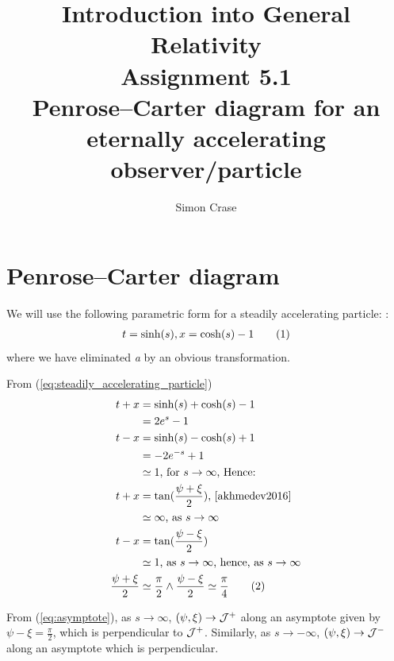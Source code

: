 \documentclass[]{article}
\title{Introduction into General Relativity\\Assignment 5.1\\Penrose--Carter diagram for an eternally accelerating observer/particle}
\author{Simon Crase}
\newcommand\numberthis{\addtocounter{equation}{1}\tag{\theequation}}
\begin{document}
\maketitle

\section{Penrose--Carter diagram}

We will use the following parametric form for a steadily accelerating particle: \cite[equation (7)]{akhmedev2016}:
\begin{align*}
t=\sinh(s), x=\cosh(s)-1 \numberthis\label{eq:steadily_accelerating_particle}
\end{align*}
where we have eliminated \emph{a} by an obvious transformation.

From (\ref{eq:steadily_accelerating_particle})
\begin{align*}
	t+x &= \sinh(s) + \cosh(s)-1\\
	&=2e^s-1\\
	t-x &= \sinh(s) - \cosh(s)+1\\
	&=-2e^{-s}+1\\
	&\simeq 1 \text{, for } s \rightarrow \infty \text{, Hence:}\\
	t+x &= \tan(\frac{\psi + \xi}{2}) \text{, \cite[V,2]{akhmedev2016}}\\
	&\simeq\infty \text{, as } s \rightarrow \infty \\
	t-x &= \tan(\frac{\psi - \xi}{2}) \\
	&\simeq 1 \text{, as } s \rightarrow \infty \text{, hence, as }  s \rightarrow \infty \\
	\frac{\psi + \xi}{2} &\simeq \frac{\pi}{2} \land \frac{\psi - \xi}{2} \simeq \frac{\pi}{4} \numberthis\label{eq:asymptote}
\end{align*}

From (\ref{eq:asymptote}), as $s \rightarrow \infty$, $(\psi,\xi) \rightarrow \cal{J}^+$ along an asymptote given by $\psi-\xi=\frac{\pi}{2}$, which is perpendicular to $\cal{J}^+$. Similarly, as $s \rightarrow -\infty$, $(\psi,\xi) \rightarrow \cal{J}^-$ along an asymptote which is perpendicular.
\end{document}
